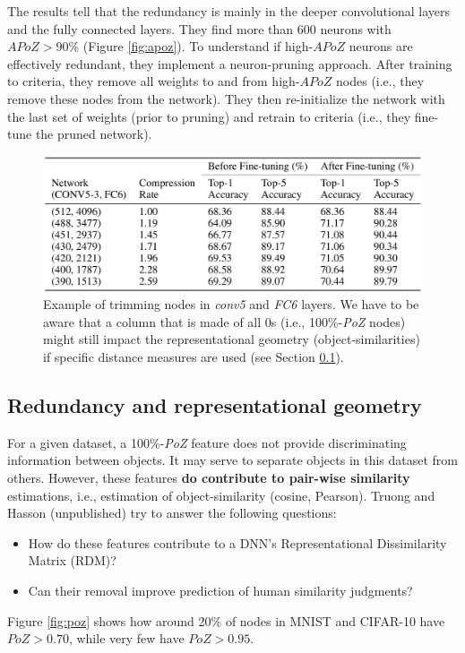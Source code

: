 The results tell that the redundancy is mainly in the deeper convolutional layers and the fully connected layers. They find more than 600 neurons with $APoZ > 90\%$ (Figure \ref{fig:apoz}).
To understand if high-$APoZ$ neurons are effectively redundant, they implement a neuron-pruning approach. After training to criteria, they remove all weights to and from high-$APoZ$ nodes (i.e., they remove these nodes from the network). They then re-initialize the network with the last set of weights (prior to pruning) and retrain to criteria (i.e., they fine-tune the pruned network).

\begin{figure}[!ht]
    \centering
    \captionsetup{width=.8\linewidth}
    \includegraphics[width=0.6\linewidth]{images/trimming.png}
    \caption*{Example of trimming nodes in \textit{conv5} and \textit{FC6} layers. We have to be aware that a column that is made of all 0s (i.e., 100\%-\textit{PoZ} nodes) might still impact the representational geometry (object-similarities) if specific distance measures are used (see Section \ref{sec:redundancy}).}
    \label{fig:trimming}
\end{figure}

\subsection{Redundancy and representational geometry}
\label{sec:redundancy}
For a given dataset, a 100\%-\textit{PoZ} feature does not provide discriminating information between objects. It may  serve to separate objects in this dataset from others. However, these features \textbf{do contribute to pair-wise similarity} estimations, i.e., estimation of object-similarity (cosine, Pearson).
Truong and Hasson (unpublished) try to answer the following questions:
\begin{itemize}
    \item How do these features contribute to a DNN's  Representational Dissimilarity Matrix (RDM)? 
    \item Can their removal improve prediction of human similarity judgments?
\end{itemize}

Figure \ref{fig:poz} shows how around 20\% of nodes in MNIST and CIFAR-10 have $PoZ>0.70$, while very few have $PoZ>0.95$.

